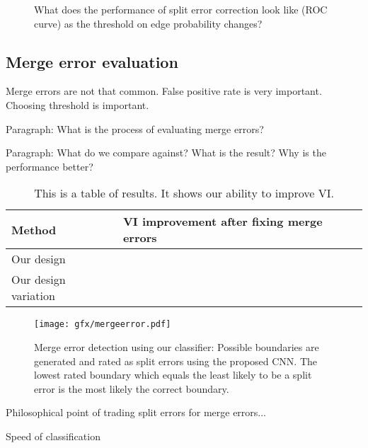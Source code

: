 \begin{figure}[t]
\missingfigure{}
\caption{What does the performance of split error correction look like (ROC curve) as the threshold on edge probability changes?}
\end{figure}

\subsection{Merge error evaluation}

Merge errors are not that common. False positive rate is very important. Choosing threshold is important.

Paragraph: What is the process of evaluating merge errors?

Paragraph: What do we compare against? What is the result? Why is the performance better?

\begin{table}[t]
\begin{tabular}{ll}
\toprule
Method & VI improvement after fixing merge errors \\
\midrule
Our design &  \\
Our design variation & \\
\bottomrule
\end{tabular}
\caption{This is a table of results. It shows our ability to improve VI.}
\end{table}

\begin{figure}[t]
\centering
\texttt{[image: gfx/mergeerror.pdf]}
\caption{Merge error detection using our classifier: Possible boundaries are generated and rated as split errors using the proposed CNN. The lowest rated boundary which equals the least likely to be a split error is the most likely the correct boundary.}
\label{fig:merge_error}
\end{figure}

Philosophical point of trading split errors for merge errors...


Speed of classification